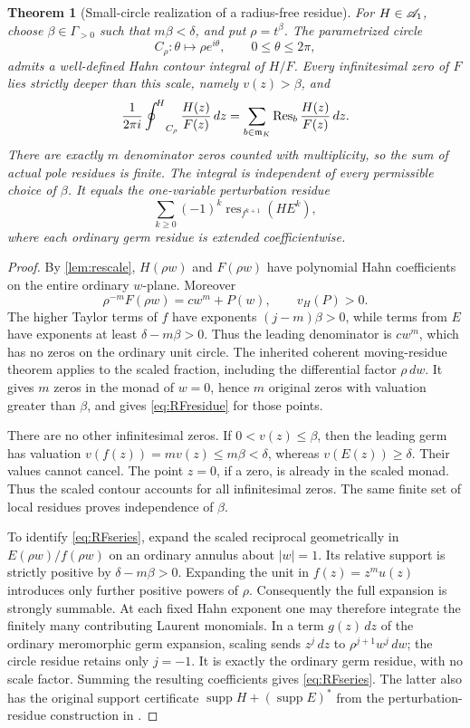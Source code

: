 \documentclass[11pt,letterpaper]{article}
\newtheorem{theorem}{Theorem}[section]
\theoremstyle{definition}
\theoremstyle{remark}
\newcommand{\supp}{\operatorname{supp}}\newcommand{\red}{\operatorname{red}}\newcommand{\st}{\operatorname{st}}
\newcommand{\Res}{\operatorname{Res}}\newcommand{\res}{\operatorname{res}}\newcommand{\ord}{\operatorname{ord}}\newcommand{\Tr}{\operatorname{Tr}}
\newcommand{\vH}{v_{\!H}}\newcommand{\re}{\operatorname{Re}}\newcommand{\im}{\operatorname{Im}}
\numberwithin{equation}{section}
\begin{document}
\begin{theorem}[Small-circle realization of a radius-free residue]\label{thm:radiusfree}
For $H\in\mathscr A_1$, choose $\beta\in\Gamma_{>0}$ such that $m\beta<\delta$, and put $\rho=t^\beta$. The parametrized circle
\[
 C_\rho:\theta\longmapsto\rho e^{i\theta},\qquad 0\le\theta\le2\pi,
\]
admits a well-defined Hahn contour integral of $H/F$. Every infinitesimal zero of $F$ lies strictly deeper than this scale, namely $v(z)>\beta$, and
\begin{equation}\label{eq:RFresidue}
 \frac1{2\pi i}\HCoint_{C_\rho}\frac{H(z)}{F(z)}\,dz
   =\sum_{b\in\m_K}\Res_b\frac{H(z)}{F(z)}\,dz.
\end{equation}
There are exactly $m$ denominator zeros counted with multiplicity, so the sum of actual pole residues is finite. The integral is independent of every permissible choice of $\beta$. It equals the one-variable perturbation residue
\begin{equation}\label{eq:RFseries}
 \sum_{k\ge0}(-1)^k\res_{f^{k+1}}(H E^k),
\end{equation}
where each ordinary germ residue is extended coefficientwise.
\end{theorem}
\begin{proof}
By \cref{lem:rescale}, $H(\rho w)$ and $F(\rho w)$ have polynomial Hahn coefficients on the entire ordinary $w$-plane. Moreover
\[
 \rho^{-m}F(\rho w)=cw^m+P(w),\qquad \vH(P)>0.
\]
The higher Taylor terms of $f$ have exponents $(j-m)\beta>0$, while terms from $E$ have exponents at least $\delta-m\beta>0$. Thus the leading denominator is $cw^m$, which has no zeros on the ordinary unit circle. The inherited coherent moving-residue theorem applies to the scaled fraction, including the differential factor $\rho\,dw$. It gives $m$ zeros in the monad of $w=0$, hence $m$ original zeros with valuation greater than $\beta$, and gives \eqref{eq:RFresidue} for those points.

There are no other infinitesimal zeros. If $0<v(z)\le\beta$, then the leading germ has valuation $v(f(z))=m v(z)\le m\beta<\delta$, whereas $v(E(z))\ge\delta$. Their values cannot cancel. The point $z=0$, if a zero, is already in the scaled monad. Thus the scaled contour accounts for all infinitesimal zeros. The same finite set of local residues proves independence of $\beta$.

To identify \eqref{eq:RFseries}, expand the scaled reciprocal geometrically in $E(\rho w)/f(\rho w)$ on an ordinary annulus about $|w|=1$. Its relative support is strictly positive by $\delta-m\beta>0$. Expanding the unit in $f(z)=z^m u(z)$ introduces only further positive powers of $\rho$. Consequently the full expansion is strongly summable. At each fixed Hahn exponent one may therefore integrate the finitely many contributing Laurent monomials. In a term $g(z)\,dz$ of the ordinary meromorphic germ expansion, scaling sends $z^j\,dz$ to $\rho^{j+1}w^j\,dw$; the circle residue retains only $j=-1$. It is exactly the ordinary germ residue, with no scale factor. Summing the resulting coefficients gives \eqref{eq:RFseries}. The latter also has the original support certificate $\supp H+(\supp E)^*$ from the perturbation-residue construction in \cite{Geometry}.
\end{proof}
\end{document}
